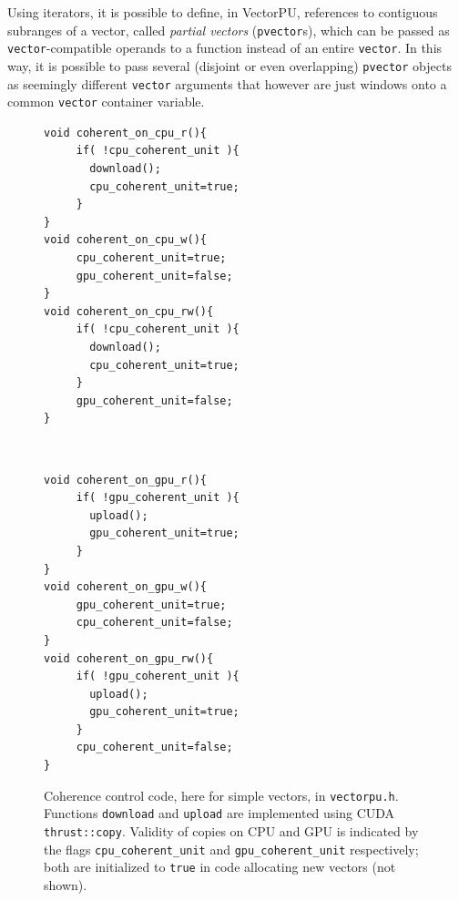 Using iterators, it is possible to define, in VectorPU, references to
contiguous subranges of a vector,
called \textit{partial vectors} (\texttt{pvector}s), 
which can be passed as \texttt{vector}-compatible
operands to a function instead of an entire \texttt{vector}.
In this way, it is possible to pass several (disjoint or even
overlapping) \texttt{pvector} objects as seemingly different \texttt{vector}
arguments that however are just windows onto
a common \texttt{vector} container variable. 

\begin{figure}[tb]
\begin{minipage}{.48\textwidth}
\begin{small}
\begin{verbatim}
void coherent_on_cpu_r(){
  	 if( !cpu_coherent_unit ){
       download();
       cpu_coherent_unit=true;
  	 }
}
void coherent_on_cpu_w(){
  	 cpu_coherent_unit=true;
  	 gpu_coherent_unit=false;
}
void coherent_on_cpu_rw(){
  	 if( !cpu_coherent_unit ){
       download();
       cpu_coherent_unit=true;
  	 }
  	 gpu_coherent_unit=false;
}
\end{verbatim}
\end{small}
\end{minipage}\qquad~
\begin{minipage}{.48\textwidth}
\begin{small}
\begin{verbatim}
void coherent_on_gpu_r(){
  	 if( !gpu_coherent_unit ){
       upload();
       gpu_coherent_unit=true;
	 }
}
void coherent_on_gpu_w(){
  	 gpu_coherent_unit=true;
  	 cpu_coherent_unit=false;
}
void coherent_on_gpu_rw(){
  	 if( !gpu_coherent_unit ){
       upload();
       gpu_coherent_unit=true;
  	 }
  	 cpu_coherent_unit=false;
}
\end{verbatim}
\end{small}
\end{minipage}
\caption{\label{fig:vectorpucoherence}Coherence control code,
    here for simple vectors,
    in \texttt{vectorpu.h}. Functions \texttt{download} and
    \texttt{upload} are implemented using CUDA
    \texttt{thrust::copy}. Validity of copies on CPU and GPU
     is indicated
     by the flags \texttt{cpu\_coherent\_unit} and
     \texttt{gpu\_coherent\_unit} respectively; both are
     initialized to \texttt{true}
     in code allocating new vectors (not shown).}
\end{figure}

